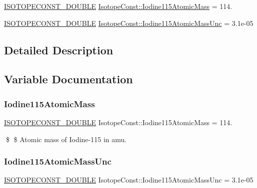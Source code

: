 \begin{DoxyCompactItemize}
\item 
\mbox{\hyperlink{group___isotope_const-_macros_ga8f45a7272ce02c0b4c65c44636ed719a}{I\+S\+O\+T\+O\+P\+E\+C\+O\+N\+S\+T\+\_\+\+D\+O\+U\+B\+LE}} \mbox{\hyperlink{group___isotope_const-_iodine-_i115_ga2247027f5565bf201e72960b1bec434c}{Isotope\+Const\+::\+Iodine115\+Atomic\+Mass}} = 114.
\item 
\mbox{\hyperlink{group___isotope_const-_macros_ga8f45a7272ce02c0b4c65c44636ed719a}{I\+S\+O\+T\+O\+P\+E\+C\+O\+N\+S\+T\+\_\+\+D\+O\+U\+B\+LE}} \mbox{\hyperlink{group___isotope_const-_iodine-_i115_ga84c89de7bf1ca1cb6ccf96afe7c4f51f}{Isotope\+Const\+::\+Iodine115\+Atomic\+Mass\+Unc}} = 3.\+1e-\/05
\end{DoxyCompactItemize}


\subsection{Detailed Description}


\subsection{Variable Documentation}
\mbox{\label{group___isotope_const-_iodine-_i115_ga2247027f5565bf201e72960b1bec434c}} 
\subsubsection{\texorpdfstring{Iodine115\+Atomic\+Mass}{Iodine115AtomicMass}}
{\footnotesize\ttfamily \mbox{\hyperlink{group___isotope_const-_macros_ga8f45a7272ce02c0b4c65c44636ed719a}{I\+S\+O\+T\+O\+P\+E\+C\+O\+N\+S\+T\+\_\+\+D\+O\+U\+B\+LE}} Isotope\+Const\+::\+Iodine115\+Atomic\+Mass = 114.}

\$ \$ Atomic mass of Iodine-\/115 in amu. \mbox{\label{group___isotope_const-_iodine-_i115_ga84c89de7bf1ca1cb6ccf96afe7c4f51f}} 
\subsubsection{\texorpdfstring{Iodine115\+Atomic\+Mass\+Unc}{Iodine115AtomicMassUnc}}
{\footnotesize\ttfamily \mbox{\hyperlink{group___isotope_const-_macros_ga8f45a7272ce02c0b4c65c44636ed719a}{I\+S\+O\+T\+O\+P\+E\+C\+O\+N\+S\+T\+\_\+\+D\+O\+U\+B\+LE}} Isotope\+Const\+::\+Iodine115\+Atomic\+Mass\+Unc = 3.\+1e-\/05}


